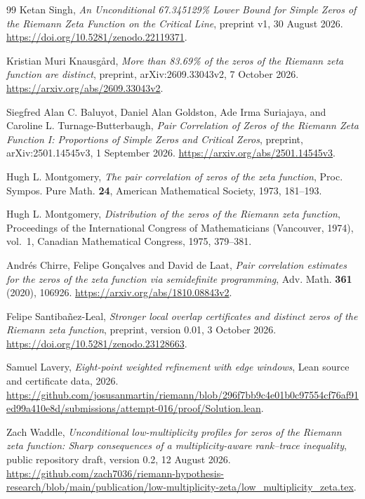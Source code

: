 \documentclass[11pt,reqno]{amsart}
\numberwithin{equation}{section}
\begin{document}
\begin{thebibliography}{99}
Ketan Singh,
\emph{An Unconditional 67.345129\% Lower Bound for Simple Zeros
of the Riemann Zeta Function on the Critical Line},
preprint v1, 30 August 2026.
\url{https://doi.org/10.5281/zenodo.22119371}.

Kristian Muri Knausg{\aa}rd,
\emph{More than 83.69\% of the zeros of the Riemann zeta function
are distinct},
preprint, arXiv:2609.33043v2, 7 October 2026.
\url{https://arxiv.org/abs/2609.33043v2}.



Siegfred Alan C. Baluyot, Daniel Alan Goldston, Ade Irma Suriajaya,
and Caroline L. Turnage-Butterbaugh,
\emph{Pair Correlation of Zeros of the Riemann Zeta Function I:
Proportions of Simple Zeros and Critical Zeros},
preprint, arXiv:2501.14545v3, 1 September 2026.
\url{https://arxiv.org/abs/2501.14545v3}.

Hugh L. Montgomery,
\emph{The pair correlation of zeros of the zeta function},
Proc. Sympos. Pure Math. \textbf{24}, American Mathematical Society,
1973, 181--193.

Hugh L. Montgomery,
\emph{Distribution of the zeros of the Riemann zeta function},
Proceedings of the International Congress of Mathematicians
(Vancouver, 1974), vol.~1, Canadian Mathematical Congress,
1975, 379--381.

Andr\'es Chirre, Felipe Gon\c{c}alves and David de Laat,
\emph{Pair correlation estimates for the zeros of the zeta function
via semidefinite programming},
Adv. Math. \textbf{361} (2020), 106926.
\url{https://arxiv.org/abs/1810.08843v2}.

Felipe Santiba\~nez-Leal,
\emph{Stronger local overlap certificates and distinct zeros of the
Riemann zeta function}, preprint, version 0.01, 3 October 2026.
\url{https://doi.org/10.5281/zenodo.23128663}.

Samuel Lavery,
\emph{Eight-point weighted refinement with edge windows},
Lean source and certificate data, 2026.
\url{https://github.com/josusanmartin/riemann/blob/296f7bb9c4e01b0c97554cf76af91ed99a410e8d/submissions/attempt-016/proof/Solution.lean}.

\begingroup{}
Zach Waddle,
\emph{Unconditional low-multiplicity profiles for zeros of the Riemann
zeta function: Sharp consequences of a multiplicity-aware rank--trace
inequality}, public repository draft, version 0.2, 12 August 2026.
\url{https://github.com/zach7036/riemann-hypothesis-research/blob/main/publication/low-multiplicity-zeta/low_multiplicity_zeta.tex}.
\par\endgroup


\end{thebibliography}
\end{document}
